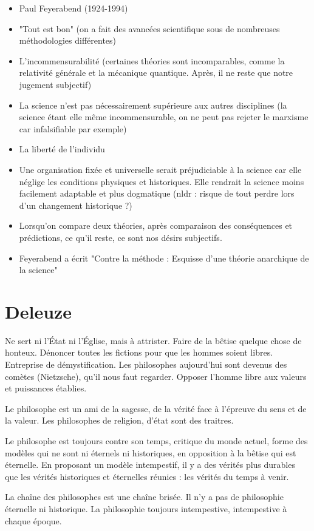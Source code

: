 \documentclass[fleqn,letterpaper, 12pt]{article}
\begin{document}
	\begin{itemize}
		\item Paul Feyerabend (1924-1994)
		\item "Tout est bon" (on a fait des avancées scientifique sous de nombreuses méthodologies différentes)
		\item L'incommensurabilité (certaines théories sont incomparables, comme la relativité générale et la mécanique quantique. Après, il ne reste que notre jugement subjectif)
		\item La science n'est pas nécessairement supérieure aux autres disciplines (la science étant elle même incommensurable, on ne peut pas rejeter le marxisme car infalsifiable par exemple)
		\item La liberté de l'individu
		\item Une organisation fixée et universelle serait préjudiciable à la science car elle néglige les conditions physiques et historiques. Elle rendrait la science moins facilement adaptable et plus dogmatique (nldr : risque de tout perdre lors d'un changement historique ?)
		\item Lorsqu'on compare deux théories, après comparaison des conséquences et prédictions, ce qu'il reste, ce sont nos désirs subjectifs.
		\item Feyerabend a écrit "Contre la méthode : Esquisse d'une théorie anarchique de la science"
	\end{itemize}
	
	
	
	\section{Deleuze}
	
	Ne sert ni l'\'Etat ni l'\'Eglise, mais à attrister. Faire de la bêtise quelque chose de honteux. Dénoncer toutes les fictions pour que les hommes soient libres. Entreprise de démystification. Les philosophes aujourd'hui sont devenus des comètes (Nietzsche), qu'il nous faut regarder. Opposer l'homme libre aux valeurs et puissances établies.
	
	Le philosophe est un ami de la sagesse, de la vérité face à l'épreuve du sens et de la valeur. Les philosophes de religion, d'état sont des traitres.
	
	Le philosophe est toujours contre son temps, critique du monde actuel, forme des modèles qui ne sont ni éternels ni historiques, en opposition à la bêtise qui est éternelle. En proposant un modèle intempestif, il y a des vérités plus durables que les vérités historiques et éternelles réunies : les vérités du temps à venir.
	
	La chaîne des philosophes est une chaîne brisée. Il n'y a pas de philosophie éternelle ni historique. La philosophie toujours intempestive, intempestive à chaque époque.
	
	
	
	


	
	
	
	
\end{document}

